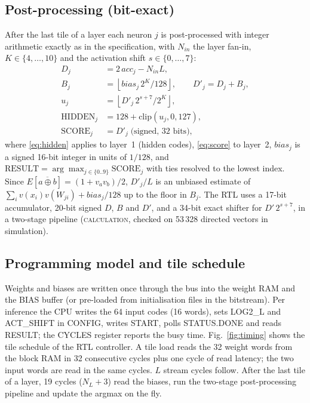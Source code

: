 \documentclass[conference]{IEEEtran}
\newcommand{\Dp}{D'}                 %
\newcommand{\NL}{N_{L}}              %
\newcommand{\lbl}[1]{\textsc{#1}}    %
\begin{document}
\subsection{Post-processing (bit-exact)}
After the last tile of a layer each neuron $j$ is post-processed with integer
arithmetic exactly as in the specification, with $N_{in}$
the layer fan-in, $K\in\{4,\dots,10\}$ and the activation shift
$s\in\{0,\dots,7\}$:
\begin{align}
  D_j &= 2\,\mathit{acc}_j - N_{in}L, \label{eq:D}\\
  B_j &= \left\lfloor \mathit{bias}_j\, 2^K / 128 \right\rfloor,
  \qquad \Dp_j = D_j + B_j, \label{eq:B}\\
  u_j &= \left\lfloor \Dp_j\, 2^{s+7} / 2^K \right\rfloor, \nonumber\\
  \mathrm{HIDDEN}_j &= 128 + \mathrm{clip}(u_j,0,127), \label{eq:hidden}\\
  \mathrm{SCORE}_j &= \Dp_j \;\text{(signed, 32 bits)}, \label{eq:score}
\end{align}
where \eqref{eq:hidden} applies to layer~1 (hidden codes),
\eqref{eq:score} to layer~2, $\mathit{bias}_j$ is a signed 16-bit integer in
units of $1/128$, and
$\mathrm{RESULT}=\arg\max_{j\in\{0..9\}}\mathrm{SCORE}_j$ with ties resolved to
the lowest index. Since $E[\overline{a\oplus b}]=(1+v_av_b)/2$,
$\Dp_j/L$ is an unbiased estimate of $\sum_i v(x_i)v(W_{ji})+\mathit{bias}_j/128$
up to the floor in $B_j$.
The RTL uses a 17-bit accumulator, 20-bit signed $D$, $B$ and $\Dp$, and a
34-bit exact shifter for $\Dp\,2^{s+7}$, in a two-stage pipeline
(\lbl{calculation}, checked on 53\,328 directed vectors in simulation).

\subsection{Programming model and tile schedule}
Weights and biases are written once through the bus into the weight RAM and the
BIAS buffer (or pre-loaded from initialisation files in the bitstream). Per
inference the CPU writes the 64 input codes (16 words), sets LOG2\_L and
ACT\_SHIFT in CONFIG, writes START, polls STATUS.DONE and reads RESULT; the
CYCLES register reports the busy time.
Fig.~\ref{fig:timing} shows the tile schedule of the RTL controller. A tile
load reads the 32 weight words from the block RAM in 32 consecutive cycles
plus one cycle of read latency; the two input words are read in the same
cycles. $L$ stream cycles follow. After the last tile of a layer, 19 cycles
($\NL+3$) read the biases, run the two-stage post-processing pipeline and
update the argmax on the fly.
\end{document}
